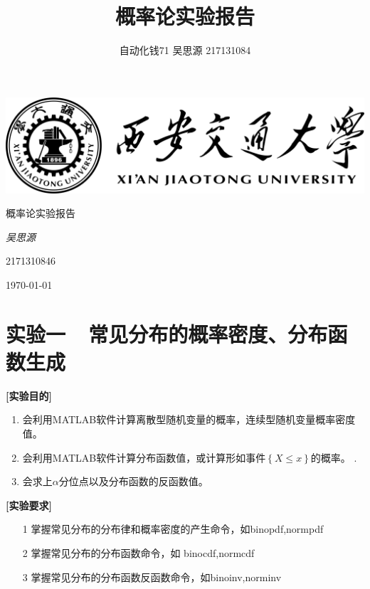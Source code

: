 \documentclass[12pt, a4paper]{ctexart}
\title{概率论实验报告}
\author{自动化钱71   吴思源   217131084}
\begin{document}
\begin{titlepage}
	\centering
	\includegraphics[width=1.0\textwidth]{./templates/logo.png}\par
	\vspace{3.5cm}
	{\fontsize{30pt}{\baselineskip}\heiti 概率论实验报告\par}
	\vspace{2cm}
	{\fangsong\Large\itshape 吴思源\par}
	\vfill
	{2171310846}\par
	\vfill
	{\large \today\par}
\end{titlepage}

\maketitle

\section{实验一~~常见分布的概率密度、分布函数生成}

\textbf{[实验目的]}
\begin{enumerate}
	\item 会利用MATLAB软件计算离散型随机变量的概率，连续型随机变量概率密度值。
	\item 会利用MATLAB软件计算分布函数值，或计算形如事件$\left\{X\le x\right\}$的概率。
.	\item 会求上$\alpha$分位点以及分布函数的反函数值。
\end{enumerate}

\textbf{[实验要求]}
\begin{enumerate}
	\item [1]掌握常见分布的分布律和概率密度的产生命令，如binopdf,normpdf
	\item [2]掌握常见分布的分布函数命令，如 binocdf,normcdf
	\item [3]掌握常见分布的分布函数反函数命令，如binoinv,norminv
	
\end{enumerate}
\end{document}
